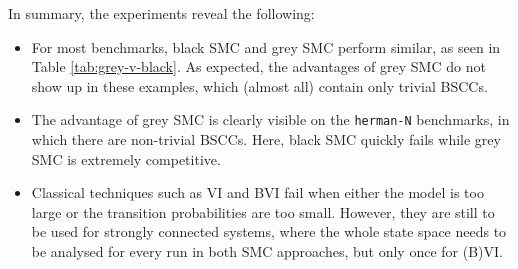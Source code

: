 In summary, the experiments reveal the following:
\begin{itemize}
	\item For most benchmarks, black SMC and grey SMC perform similar, as seen in Table \ref{tab:grey-v-black}. 
	As expected, the advantages of grey SMC do not show up in these examples, which (almost all) contain only trivial BSCCs.
	\item The advantage of grey SMC is clearly visible on the \texttt{herman-N} benchmarks, in which there are non-trivial BSCCs. Here, black SMC quickly fails while grey SMC is extremely competitive.
	\item Classical techniques such as VI and BVI fail when either the model is too large or the transition probabilities are too small.
	However, they are still to be used for strongly connected systems, where the whole state space needs to be analysed for every run in both SMC approaches, but only once for (B)VI.%
\end{itemize}